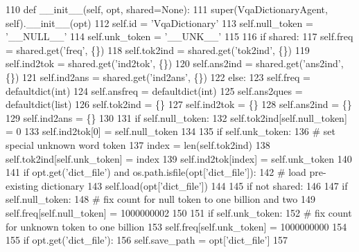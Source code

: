 \begin{DoxyCode}
110     \textcolor{keyword}{def }\_\_init\_\_(self, opt, shared=None):
111         super(VqaDictionaryAgent, self).\_\_init\_\_(opt)
112         self.id = \textcolor{stringliteral}{'VqaDictionary'}
113         self.null\_token = \textcolor{stringliteral}{'\_\_NULL\_\_'}
114         self.unk\_token = \textcolor{stringliteral}{'\_\_UNK\_\_'}
115 
116         \textcolor{keywordflow}{if} shared:
117             self.freq = shared.get(\textcolor{stringliteral}{'freq'}, \{\})
118             self.tok2ind = shared.get(\textcolor{stringliteral}{'tok2ind'}, \{\})
119             self.ind2tok = shared.get(\textcolor{stringliteral}{'ind2tok'}, \{\})
120             self.ans2ind = shared.get(\textcolor{stringliteral}{'ans2ind'}, \{\})
121             self.ind2ans = shared.get(\textcolor{stringliteral}{'ind2ans'}, \{\})
122         \textcolor{keywordflow}{else}:
123             self.freq = defaultdict(int)
124             self.ansfreq = defaultdict(int)
125             self.ans2ques = defaultdict(list)
126             self.tok2ind = \{\}
127             self.ind2tok = \{\}
128             self.ans2ind = \{\}
129             self.ind2ans = \{\}
130 
131             \textcolor{keywordflow}{if} self.null\_token:
132                 self.tok2ind[self.null\_token] = 0
133                 self.ind2tok[0] = self.null\_token
134 
135             \textcolor{keywordflow}{if} self.unk\_token:
136                 \textcolor{comment}{# set special unknown word token}
137                 index = len(self.tok2ind)
138                 self.tok2ind[self.unk\_token] = index
139                 self.ind2tok[index] = self.unk\_token
140 
141         \textcolor{keywordflow}{if} opt.get(\textcolor{stringliteral}{'dict\_file'}) \textcolor{keywordflow}{and} os.path.isfile(opt[\textcolor{stringliteral}{'dict\_file'}]):
142             \textcolor{comment}{# load pre-existing dictionary}
143             self.load(opt[\textcolor{stringliteral}{'dict\_file'}])
144 
145         \textcolor{keywordflow}{if} \textcolor{keywordflow}{not} shared:
146 
147             \textcolor{keywordflow}{if} self.null\_token:
148                 \textcolor{comment}{# fix count for null token to one billion and two}
149                 self.freq[self.null\_token] = 1000000002
150 
151             \textcolor{keywordflow}{if} self.unk\_token:
152                 \textcolor{comment}{# fix count for unknown token to one billion}
153                 self.freq[self.unk\_token] = 1000000000
154 
155             \textcolor{keywordflow}{if} opt.get(\textcolor{stringliteral}{'dict\_file'}):
156                 self.save\_path = opt[\textcolor{stringliteral}{'dict\_file'}]
157 
\end{DoxyCode}


